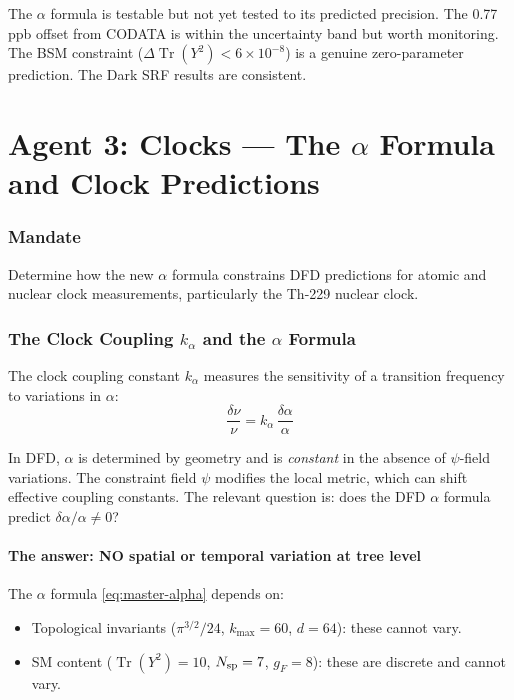 \documentclass[11pt,a4paper]{article}
\newcommand{\Tr}{\operatorname{Tr}}
\begin{document}
The $\alpha$ formula is testable but not yet tested to its predicted precision. The 0.77 ppb offset from CODATA is within the uncertainty band but worth monitoring. The BSM constraint ($\Delta\Tr(Y^2) < 6 \times 10^{-8}$) is a genuine zero-parameter prediction. The Dark SRF results are consistent.


\part{Agent 3: Clocks --- The $\alpha$ Formula and Clock Predictions}
\label{part:agent3}

\section{Mandate}
Determine how the new $\alpha$ formula constrains DFD predictions for atomic and nuclear clock measurements, particularly the Th-229 nuclear clock.

\section{The Clock Coupling $k_\alpha$ and the $\alpha$ Formula}

The clock coupling constant $k_\alpha$ measures the sensitivity of a transition frequency to variations in $\alpha$:
\begin{equation}
\frac{\delta\nu}{\nu} = k_\alpha\,\frac{\delta\alpha}{\alpha}
\end{equation}

In DFD, $\alpha$ is determined by geometry and is \emph{constant} in the absence of $\psi$-field variations. The constraint field $\psi$ modifies the local metric, which can shift effective coupling constants. The relevant question is: does the DFD $\alpha$ formula predict $\delta\alpha/\alpha \neq 0$?

\subsection{The answer: NO spatial or temporal variation at tree level}

The $\alpha$ formula \eqref{eq:master-alpha} depends on:
\begin{itemize}
\item Topological invariants ($\pi^{3/2}/24$, $k_{\max} = 60$, $d = 64$): these cannot vary.
\item SM content ($\Tr(Y^2) = 10$, $N_{\rm sp} = 7$, $g_F = 8$): these are discrete and cannot vary.
\end{itemize}
\end{document}
